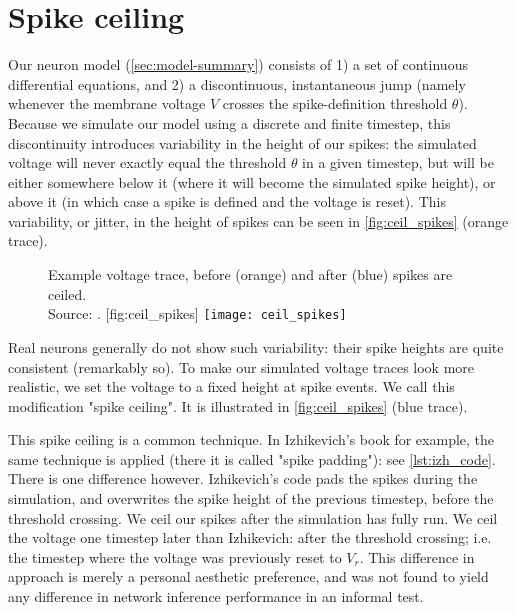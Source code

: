 \FloatBarrier
\section{Spike ceiling}
\label{sec:spike_ceiling}

Our neuron model  (\cref{sec:model-summary}) consists of 1) a set of continuous differential equations, and 2) a discontinuous, instantaneous jump (namely whenever the membrane voltage $V$ crosses the spike-definition threshold $θ$).
Because we simulate our model using a discrete and finite timestep, this discontinuity introduces variability in the height of our spikes: the simulated voltage will never exactly equal the threshold $θ$ in a given timestep, but will be either somewhere below it (where it will become the simulated spike height), or above it (in which case a spike is defined and the voltage is reset).
This variability, or jitter, in the height of spikes can be seen in \cref{fig:ceil_spikes} (orange trace).

\begin{figure}
    \begin{sidecaption}
        {
            Example voltage trace, before (orange) and after (blue) spikes are ceiled.\\
            Source: .
        }
        [fig:ceil_spikes]
        \texttt{[image: ceil\_spikes]}
    \end{sidecaption}
\end{figure}

Real neurons generally do not show such variability: their spike heights are quite consistent (remarkably so). To make our simulated voltage traces look more realistic, we set the voltage to a fixed height at spike events. We call this modification "spike ceiling". It is illustrated in \cref{fig:ceil_spikes} (blue trace).

This spike ceiling is a common technique. In Izhikevich's book for example, the same technique is applied (there it is called "spike padding"): see \cref{lst:izh_code}. There is one difference however. Izhikevich's code pads the spikes during the simulation, and overwrites the spike height of the previous timestep, before the threshold crossing. We ceil our spikes after the simulation has fully run. We ceil the voltage one timestep later than Izhikevich: after the threshold crossing; i.e. the timestep where the voltage was previously reset to $V_r$.
This difference in approach is merely a personal aesthetic preference, and was not found to yield any difference in network inference performance in an informal test.

